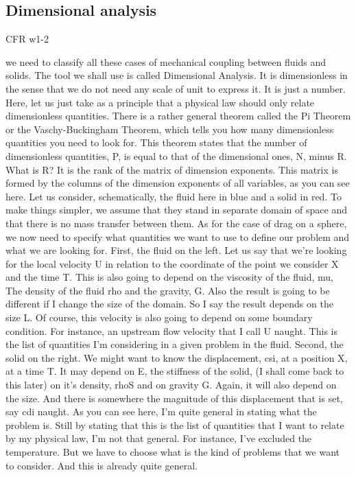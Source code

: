 \subsection{Dimensional analysis}

CFR w1-2

we need to classify all these cases of mechanical coupling between fluids and solids. 
The tool we shall use is called Dimensional Analysis.
It is dimensionless in the sense that we do not need any scale of unit to express it. It is just a number.
Here, let us just take as a principle that a physical law should only relate dimensionless quantities.
There is a rather general
theorem called the Pi Theorem or the Vaschy-Buckingham Theorem, which tells you how many dimensionless
quantities you need to look for. This theorem states that the number
of dimensionless quantities, P, is equal to that of
the dimensional ones, N, minus R. What is R? It is the rank of the matrix
of dimension exponents. This matrix is formed by the columns of
the dimension exponents of all variables, as you can see here.
Let us consider, schematically,
the fluid here in blue and a solid in red. To make things simpler, we assume that
they stand in separate domain of space and that there is no mass
transfer between them. As for the case of drag on a sphere,
we now need to specify what quantities we want to use to define
our problem and what we are looking for. First, the fluid on the left. Let us say that we're looking for
the local velocity U in relation to the coordinate of the point
we consider X and the time T. This is also going to depend on
the viscosity of the fluid, mu, The density of the fluid rho and
the gravity, G. Also the result is going to be different
if I change the size of the domain. So I say the result depends on the size L. Of course, this velocity is also going to
depend on some boundary condition. For instance, an upstream flow
velocity that I call U naught. This is the list of quantities I'm
considering in a given problem in the fluid. Second, the solid on the right. We might want to know the displacement,
csi, at a position X, at a time T. It may depend on E,
the stiffness of the solid, (I shall come back to this later) on it's density, rhoS and on gravity G. Again, it will also depend on the size. And there is somewhere the magnitude of this displacement that is set,
say cdi naught. As you can see here,
I'm quite general in stating what the problem is. Still by stating that this is
the list of quantities that I want to relate by my physical law,
I'm not that general. For instance,
I've excluded the temperature. But we have to choose what is the kind of
problems that we want to consider. And this is already quite general.

